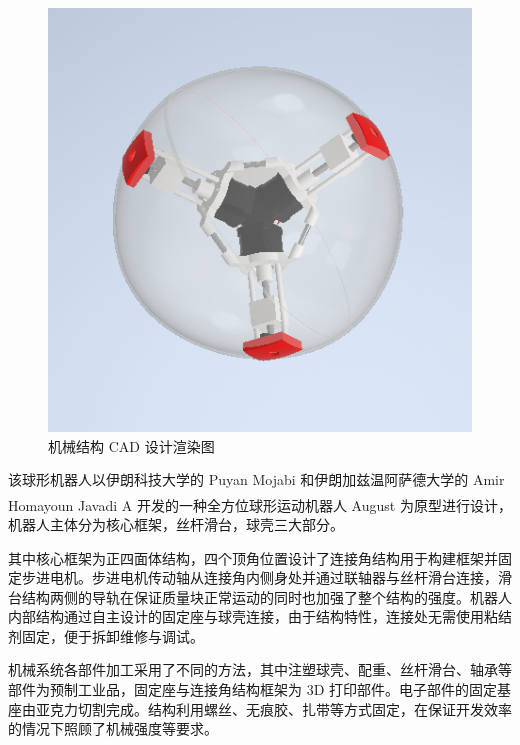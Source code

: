 \documentclass[a4paper]{ctexart}
\newcommand{ \upcite}[1]{\textsuperscript{\textsuperscript{\cite{#1} } }}
\numberwithin{equation}{section}
\numberwithin{table}{section}
\numberwithin{figure}{section}
\begin{document}
\begin{figure}[H]
\begin{minipage}{0.32\linewidth}
\begin{center}
    \end{center}
  \end{minipage}
  \hfill
  \begin{minipage}{0.32\linewidth}
    \begin{center}
      \includegraphics[width=0.98\linewidth]{figures/rendered3.png}
    \end{center}
  \end{minipage}
  \caption{机械结构 CAD 设计渲染图}
\end{figure}

该球形机器人以伊朗科技大学的 Puyan Mojabi 和伊朗加兹温阿萨德大学的 Amir Homayoun Javadi A 开发的一种全方位球形运动机器人 August\upcite{2004Introducing} 为原型进行设计，机器人主体分为核心框架，丝杆滑台，球壳三大部分。

其中核心框架为正四面体结构，四个顶角位置设计了连接角结构用于构建框架并固定步进电机。步进电机传动轴从连接角内侧身处并通过联轴器与丝杆滑台连接，滑台结构两侧的导轨在保证质量块正常运动的同时也加强了整个结构的强度。机器人内部结构通过自主设计的固定座与球壳连接，由于结构特性，连接处无需使用粘结剂固定，便于拆卸维修与调试。

机械系统各部件加工采用了不同的方法，其中注塑球壳、配重、丝杆滑台、轴承等部件为预制工业品，固定座与连接角结构框架为 3D 打印部件。电子部件的固定基座由亚克力切割完成。结构利用螺丝、无痕胶、扎带等方式固定，在保证开发效率的情况下照顾了机械强度等要求。
\end{document}
